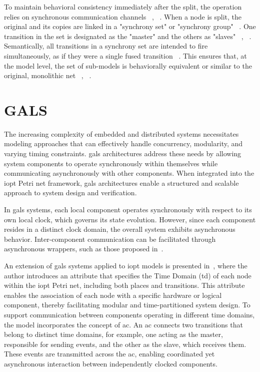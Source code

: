 \begin{itemize}
To maintain behavioral consistency immediately after the split, the operation relies on synchronous communication channels ~\cite{splitting}, ~\cite{co-design}. When a node is split, the original and its copies are linked in a "synchrony set" or "synchrony group" ~\cite{co-design}. One transition in the set is designated as the "master" and the others as "slaves" ~\cite{splitting}, ~\cite{co-design}. Semantically, all transitions in a synchrony set are intended to fire simultaneously, as if they were a single fused transition ~\cite{splitting}. This ensures that, at the model level, the set of sub-models is behaviorally equivalent or similar to the original, monolithic net ~\cite{splitting}, ~\cite{co-design}.

\end{itemize}



\section{GALS}
\label{sec:gals}


The increasing complexity of embedded and distributed systems necessitates modeling approaches that can effectively handle concurrency, modularity, and varying timing constraints. \gls{gals} architectures address these needs by allowing system components to operate synchronously within themselves while communicating asynchronously with other components. When integrated into the \gls{iopt} Petri net framework, \gls{gals} architectures enable a structured and scalable approach to system design and verification.

In \gls{gals} systems, each local component operates synchronously with respect to its own local clock, which governs its state evolution. However, since each component resides in a distinct clock domain, the overall system exhibits asynchronous behavior. Inter-component communication can be facilitated through asynchronous wrappers, such as those proposed in~\cite{galsborman}.


An extension of \gls{gals} systems applied to \gls{iopt} models is presented in~\cite{galsactd}, where the author introduces an attribute that specifies the Time Domain (\gls{td}) of each node within the \gls{iopt} Petri net, including both places and transitions. This attribute enables the association of each node with a specific hardware or logical component, thereby facilitating modular and time-partitioned system design.
To support communication between components operating in different time domains, the model incorporates the concept of \gls{ac}. An \gls{ac} connects two transitions that belong to distinct time domains, for example, one acting as the master, responsible for sending events, and the other as the slave, which receives them. These events are transmitted across the \gls{ac}, enabling coordinated yet asynchronous interaction between independently clocked components.



